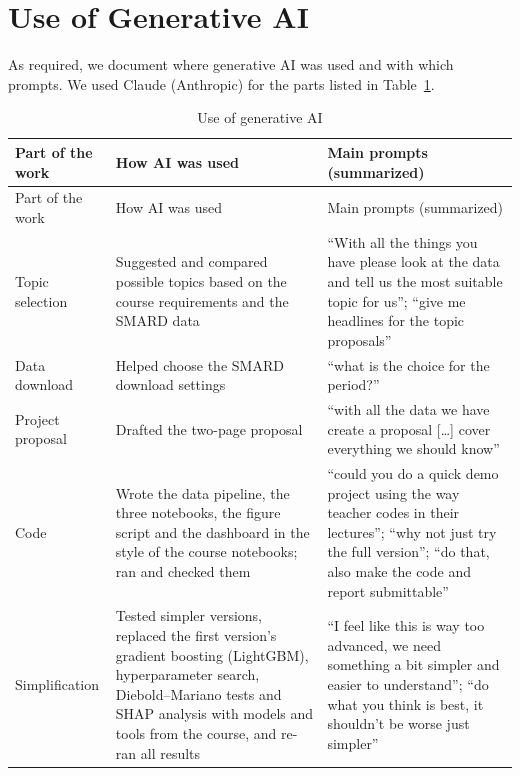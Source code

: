 \documentclass[12pt,oneside]{article}
\begin{document}
\section{Use of Generative AI} \label{sec:genai}

As required, we document where generative AI was used and with which prompts. We used Claude (Anthropic) for the parts listed in Table~\ref{tab:genai}. %

{\small
\begin{longtable}{@{}>{\raggedright\arraybackslash}p{}>{\raggedright\arraybackslash}p{}>{\raggedright\arraybackslash}p{}@{}}
    \caption{Use of generative AI}\label{tab:genai}\\
    \toprule
    Part of the work & How AI was used & Main prompts (summarized) \\
    \midrule
    \endfirsthead
    \toprule
    Part of the work & How AI was used & Main prompts (summarized) \\
    \midrule
    \endhead
    \bottomrule
    \endlastfoot
        Topic selection & Suggested and compared possible topics based on the course requirements and the SMARD data & \enquote{With all the things you have please look at the data and tell us the most suitable topic for us}; \enquote{give me headlines for the topic proposals} \\
        \midrule
        Data download & Helped choose the SMARD download settings & \enquote{what is the choice for the period?} \\
        \midrule
        Project proposal & Drafted the two-page proposal & \enquote{with all the data we have create a proposal [\ldots] cover everything we should know} \\
        \midrule
        Code & Wrote the data pipeline, the three notebooks, the figure script and the dashboard in the style of the course notebooks; ran and checked them & \enquote{could you do a quick demo project using the way teacher codes in their lectures}; \enquote{why not just try the full version}; \enquote{do that, also make the code and report submittable} \\
        \midrule
        Simplification & Tested simpler versions, replaced the first version's gradient boosting (LightGBM), hyperparameter search, Diebold--Mariano tests and SHAP analysis with models and tools from the course, and re-ran all results & \enquote{I feel like this is way too advanced, we need something a bit simpler and easier to understand}; \enquote{do what you think is best, it shouldn't be worse just simpler} \\

\end{longtable}}
\end{document}
